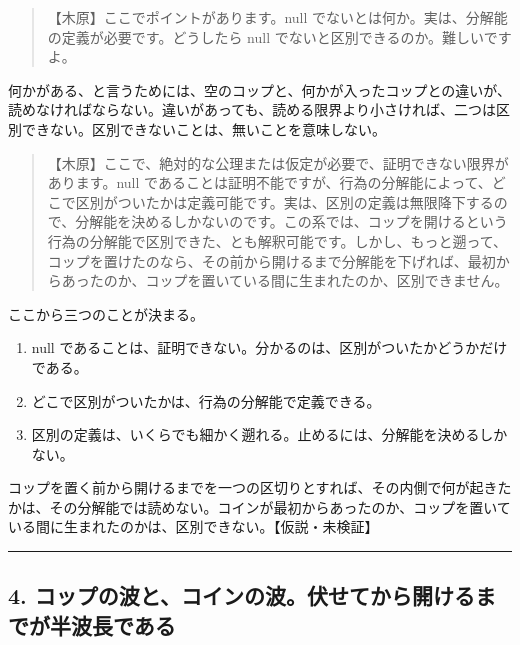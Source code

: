 \documentclass[
  a4paper,
]{ltjsarticle}
\providecommand{\tightlist}{%
  \setlength{\itemsep}{0pt}\setlength{\parskip}{0pt}}
\begin{document}
\begin{quote}
【木原】ここでポイントがあります。null
でないとは何か。実は、分解能の定義が必要です。どうしたら null
でないと区別できるのか。難しいですよ。
\end{quote}

何かがある、と言うためには、空のコップと、何かが入ったコップとの違いが、読めなければならない。違いがあっても、読める限界より小さければ、二つは区別できない。区別できないことは、無いことを意味しない。

\begin{quote}
【木原】ここで、絶対的な公理または仮定が必要で、証明できない限界があります。null
であることは証明不能ですが、行為の分解能によって、どこで区別がついたかは定義可能です。実は、区別の定義は無限降下するので、分解能を決めるしかないのです。この系では、コップを開けるという行為の分解能で区別できた、とも解釈可能です。しかし、もっと遡って、コップを置けたのなら、その前から開けるまで分解能を下げれば、最初からあったのか、コップを置いている間に生まれたのか、区別できません。
\end{quote}

ここから三つのことが決まる。

\begin{enumerate}
\def\labelenumi{\arabic{enumi}.}
\tightlist
\item
  null
  であることは、証明できない。分かるのは、区別がついたかどうかだけである。
\item
  どこで区別がついたかは、行為の分解能で定義できる。
\item
  区別の定義は、いくらでも細かく遡れる。止めるには、分解能を決めるしかない。
\end{enumerate}

コップを置く前から開けるまでを一つの区切りとすれば、その内側で何が起きたかは、その分解能では読めない。コインが最初からあったのか、コップを置いている間に生まれたのかは、区別できない。【仮説・未検証】

\begin{center}\rule{0.5\linewidth}{0.5pt}\end{center}

\subsection{4.
コップの波と、コインの波。伏せてから開けるまでが半波長である}\label{ux30b3ux30c3ux30d7ux306eux6ce2ux3068ux30b3ux30a4ux30f3ux306eux6ce2ux4f0fux305bux3066ux304bux3089ux958bux3051ux308bux307eux3067ux304cux534aux6ce2ux9577ux3067ux3042ux308b}
\end{document}
